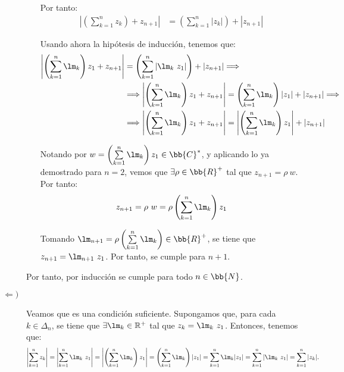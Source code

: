 \begin{ejercicio}
\begin{description}
\begin{itemize}
            Por tanto:
            \begin{align*}
                \left|\left(\sum_{k=1}^{n} z_k\right) + z_{n+1}\right| &= \left(\sum_{k=1}^{n} |z_k|\right) + |z_{n+1}|
            \end{align*}

            Usando ahora la hipótesis de inducción, tenemos que:
            \begin{align*}
                \left|\left(\sum_{k=1}^{n} \lm_k\right)z_1 + z_{n+1}\right| &= \left(\sum_{k=1}^{n} |\lm_k~z_1|\right) + |z_{n+1}|
                \Longrightarrow
                \\&\Longrightarrow
                \left|\left(\sum_{k=1}^{n} \lm_k\right)z_1 + z_{n+1}\right| = \left(\sum_{k=1}^{n} \lm_k\right)|z_1| + |z_{n+1}|
                \Longrightarrow
                \\&\Longrightarrow
                \left|\left(\sum_{k=1}^{n} \lm_k\right)z_1 + z_{n+1}\right| = \left|\left(\sum_{k=1}^{n} \lm_k\right)z_1\right| + |z_{n+1}|
            \end{align*}

            Notando por $w=\left(\sum\limits_{k=1}^{n} \lm_k\right)z_1\in \bb{C}^*$, y aplicando lo ya demostrado para $n=2$, vemos que $\exists \rho \in \bb{R}^+$ tal que $z_{n+1}=\rho~w$. Por tanto:
            \begin{equation*}
                z_{n+1} = \rho~w = \rho\left(\sum_{k=1}^{n} \lm_k\right)z_1 
            \end{equation*}

            Tomando $\lm_{n+1}=\rho\left(\sum\limits_{k=1}^{n} \lm_k\right)\in \bb{R}^+$, se tiene que $z_{n+1}=\lm_{n+1}~z_1$. Por tanto, se cumple para $n+1$.
        \end{itemize}

        Por tanto, por inducción se cumple para todo $n\in \bb{N}$.
        
        \item[$\Longleftarrow)$] Veamos que es una condición suficiente. Supongamos que, para cada $k\in \Delta_n$, se tiene que $\exists \lm_k\in \mathbb{R}^+$ tal que $z_k = \lm_k~z_1$. Entonces, tenemos que:
        \begin{align*}
            \left|\sum_{k=1}^n z_k\right| &= \left|\sum_{k=1}^n \lm_k~z_1\right| = \left|\left(\sum_{k=1}^n \lm_k\right)z_1\right|
            = \left(\sum_{k=1}^n \lm_k\right)|z_1| = \sum_{k=1}^n \lm_k|z_1| = \sum_{k=1}^n |\lm_k~z_1| = \sum_{k=1}^n |z_k|.
        \end{align*}
    \end{description}
\end{ejercicio}

